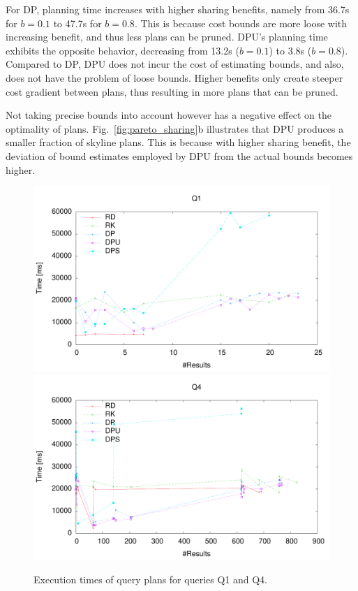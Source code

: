 For DP, planning time increases with higher sharing
benefits, namely from 36.7s for $b=0.1$ to 47.7s for $b=0.8$.  This is because cost bounds
are more loose with increasing benefit, and thus less plans can be pruned. 
DPU's planning time exhibits the opposite behavior, decreasing from 13.2s ($b=0.1$) to 3.8s
($b=0.8$). Compared to DP, DPU does not incur the cost of estimating bounds, and also, does not have the problem of loose bounds. Higher benefits only create steeper cost gradient
between plans, thus resulting in more plans that can be pruned.

Not taking precise bounds into account however has a negative effect on the optimality of plans. Fig.~\ref{fig:pareto_sharing}b illustrates that DPU produces a smaller fraction of skyline plans. This is because with higher sharing benefit, the deviation of bound estimates employed by DPU from the actual bounds becomes higher.  


\begin{figure}[htb]
  \vspace{-0.5cm}
  \centering
  \includegraphics[width=0.8\linewidth]{figs/pareto_exec_0_q2.pdf}
  \includegraphics[width=0.8\linewidth]{figs/pareto_exec_0_q19.pdf}
  \caption{Execution times of query plans for queries Q1 and Q4.}
  \label{fig:exec}
  \vspace{-0.2cm}
\end{figure}



